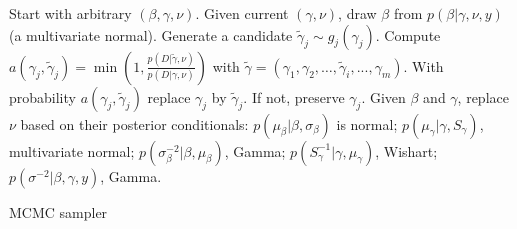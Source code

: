 \begin{algorithm}[!ht]
\begin{algorithmic}
\State Start with arbitrary $(\beta , \gamma ,\nu )$.
 \State Given current $(\gamma,\nu)$, draw  
    $\beta$ from  
    $p(\beta|\gamma,\nu,y)$ (a multivariate normal).
    \State Generate a candidate $\tilde\gamma_j \sim g_j(\gamma_j)$.
    \State Compute 
    $
       a(\gamma_j,\tilde\gamma_j) =
       \min\left(1,\frac{p(D |\tilde\gamma,\nu)}
                       {p(D |\gamma,\nu)}\right)
    $
    with $\tilde\gamma = (\gamma_1,\gamma_2,\ldots,\tilde\gamma_i, ...,\gamma_m)$.
    \State With probability $a(\gamma_j,\tilde\gamma_j)$ replace $\gamma_j$
    by $\tilde\gamma_j$. If not, preserve $\gamma_j$.
    \EndFor
    \State Given $\beta$ and $\gamma$, replace $\nu$
        based on their posterior conditionals:
 $p(\mu_\beta|\beta,\sigma_\beta)$ is normal;
 $p(\mu_\gamma|\gamma,S_\gamma)$, multivariate normal;
 $p(\sigma_\beta^{-2}|\beta,\mu_\beta)$, Gamma; 
    $p(S_\gamma^{-1}|\gamma,\mu_\gamma)$, Wishart; 
    $p(\sigma^{-2}|\beta,\gamma,y)$, Gamma.
    
\EndWhile
\end{algorithmic}
 \caption{MCMC sampler}\label{alg:mcmc}
\end{algorithm}



